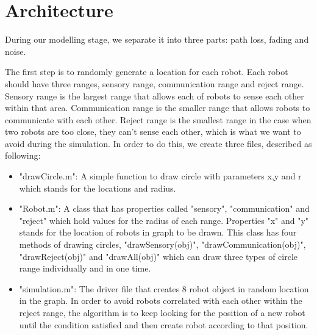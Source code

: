 \section{Architecture}
\label{sec:architecture}
	During our modelling stage, we separate it into three parts: path loss, fading and noise. \par
	The first step is to randomly generate a location for each robot. Each robot should have three ranges, sensory range, communication range and reject range. Sensory range is the largest range that allows each of robots to sense each other within that area. Communication range is the smaller range that allows robots to communicate with each other. Reject range is the smallest range in the case when two robots are too close, they can't sense each other, which is what we want to avoid during the simulation. In order to do this, we create three files, described as following:

\begin{itemize}
\item "drawCircle.m": A simple function to draw circle with parameters x,y and r which stands for the locations and radius. \item "Robot.m": A class that has properties called "sensory", "communication" and "reject" which hold values for the radius of each range. Properties "x" and "y" stands for the location of robots in graph to be drawn. This class has four methods of drawing circles, "drawSensory(obj)", "drawCommunication(obj)", "drawReject(obj)" and "drawAll(obj)" which can draw three types of circle range individually and in one time. 
\item "simulation.m": The driver file that creates 8 robot object in random location in the graph. In order to avoid robots correlated with each other within the reject range, the algorithm is to keep looking for the position of a new robot until the condition satisfied and then create robot according to that position. 
\end{itemize}



